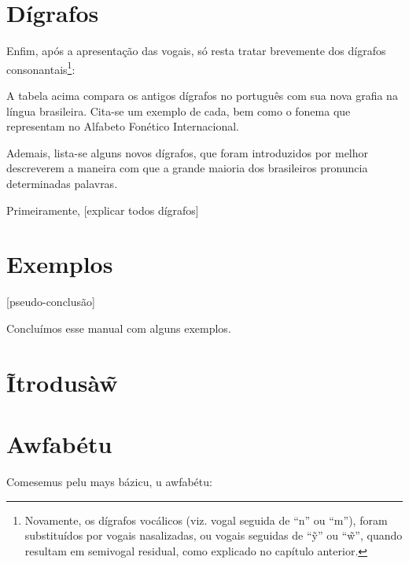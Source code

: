 \documentclass[12pt, a5paper, titlepage]{article}
\begin{document}
\begin{bilingualpages}
    [comentar]



    \section{Dígrafos}
    Enfim, após a apresentação das vogais, só resta tratar brevemente dos dígrafos consonantais\footnote{
        Novamente, os dígrafos vocálicos (viz. vogal seguida de ``n'' ou ``m''), foram substituídos por vogais nasalizadas, ou vogais seguidas de ``\~y'' ou ``\~w'', quando resultam em semivogal residual, como explicado no capítulo anterior.
    }:

    \PtTableDigraphs

    A tabela acima compara os antigos dígrafos no português com sua nova grafia na língua brasileira. Cita-se um exemplo de cada, bem como o fonema que representam no Alfabeto Fonético Internacional.

    Ademais, lista-se alguns novos dígrafos, que foram introduzidos por melhor descreverem a maneira com que a grande maioria dos brasileiros pronuncia determinadas palavras.

    Primeiramente, [explicar todos dígrafos]

    \section{Exemplos}
    [pseudo-conclusão]

    Concluímos esse manual com alguns exemplos.

    \leftpage
    \section{Ĩtrodusà\~w}

    \newpage
    \section{Awfabétu}
    Comesemus pelu mays bázicu, u awfabétu:
    \BrTableAbc


\end{bilingualpages}
\end{document}
